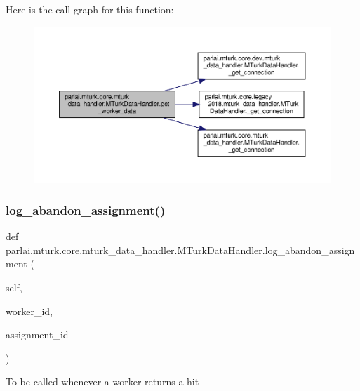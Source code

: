 Here is the call graph for this function\+:
\nopagebreak
\begin{figure}[H]
\begin{center}
\leavevmode
\includegraphics[width=350pt]{classparlai_1_1mturk_1_1core_1_1mturk__data__handler_1_1MTurkDataHandler_a45c012ee9fa36a52f9286ccc3ab1be3a_cgraph}
\end{center}
\end{figure}
\mbox{\label{classparlai_1_1mturk_1_1core_1_1mturk__data__handler_1_1MTurkDataHandler_ab4a4d10fa1923efc5dfdcf2e451c816f}} 
\subsubsection{\texorpdfstring{log\+\_\+abandon\+\_\+assignment()}{log\_abandon\_assignment()}}
{\footnotesize\ttfamily def parlai.\+mturk.\+core.\+mturk\+\_\+data\+\_\+handler.\+M\+Turk\+Data\+Handler.\+log\+\_\+abandon\+\_\+assignment (\begin{DoxyParamCaption}\item[{}]{self,  }\item[{}]{worker\+\_\+id,  }\item[{}]{assignment\+\_\+id }\end{DoxyParamCaption})}

\begin{DoxyVerb}To be called whenever a worker returns a hit\end{DoxyVerb}
 

